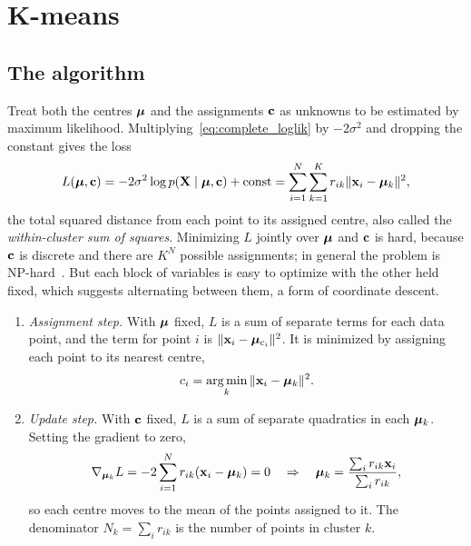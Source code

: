 \section{K-means}
\label{sec:kmeans}

\subsection{The algorithm}

Treat both the centres $\boldsymbol{\mu}$ and the assignments $\mathbf{c}$ as unknowns to be estimated by maximum likelihood. Multiplying~\eqref{eq:complete_loglik} by $-2\sigma^2$ and dropping the constant gives the loss
\begin{equation}
  L(\boldsymbol{\mu},\mathbf{c}) = -2\sigma^2\log p(\mathbf{X}\mid\boldsymbol{\mu},\mathbf{c}) + \text{const} = \sum_{i=1}^N\sum_{k=1}^K r_{ik}\|\mathbf{x}_i-\boldsymbol{\mu}_k\|^2 ,
  \label{eq:kmeans_loss}
\end{equation}
the total squared distance from each point to its assigned centre, also called the \emph{within-cluster sum of squares}. Minimizing $L$ jointly over $\boldsymbol{\mu}$ and $\mathbf{c}$ is hard, because $\mathbf{c}$ is discrete and there are $K^N$ possible assignments; in general the problem is NP-hard~\citep{aloise2009}. But each block of variables is easy to optimize with the other held fixed, which suggests alternating between them, a form of coordinate descent.
\begin{enumerate}
  \item \emph{Assignment step.} With $\boldsymbol{\mu}$ fixed, $L$ is a sum of separate terms for each data point, and the term for point $i$ is $\|\mathbf{x}_i-\boldsymbol{\mu}_{c_i}\|^2$. It is minimized by assigning each point to its nearest centre,
  \begin{equation}
    c_i = \operatorname*{arg\,min}_k\|\mathbf{x}_i-\boldsymbol{\mu}_k\|^2 .
  \end{equation}
  \item \emph{Update step.} With $\mathbf{c}$ fixed, $L$ is a sum of separate quadratics in each $\boldsymbol{\mu}_k$. Setting the gradient to zero,
  \begin{equation}
    \nabla_{\boldsymbol{\mu}_k}L = -2\sum_{i=1}^N r_{ik}(\mathbf{x}_i-\boldsymbol{\mu}_k) = 0
    \quad\Rightarrow\quad
    \boldsymbol{\mu}_k = \frac{\sum_{i}r_{ik}\mathbf{x}_i}{\sum_i r_{ik}} ,
    \label{eq:kmeans_update}
  \end{equation}
  so each centre moves to the mean of the points assigned to it. The denominator $N_k=\sum_i r_{ik}$ is the number of points in cluster $k$.
\end{enumerate}
